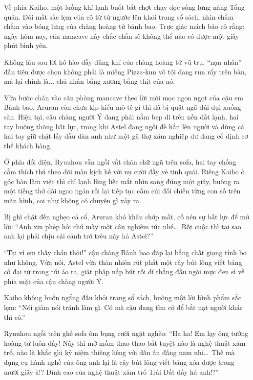 \documentclass[../main.tex]{subfiles}
\begin{document}
Về phía Kaiho, một luồng khí lạnh buốt bất chợt chạy dọc sống lưng nàng Tổng quản. Đôi mắt sắc lẹm của cô từ từ ngước lên khỏi trang sổ sách, nhìn chằm chằm vào bóng lưng của chàng hoàng tử bảnh bao. Trực giác mách bảo cô rằng: ngày hôm nay, căn mancave này chắc chắn sẽ không thể nào có được một giây phút bình yên.

\ct

Không lâu sau lời hô hào đầy dũng khí của chàng hoàng tử vũ trụ, ``nạn nhân'' đầu tiên được chọn không phải là miếng Pizza-kun vô tội đang run rẩy trên bàn, mà lại chính là... chủ nhân bằng xương bằng thịt của nó.

Vừa bước chân vào căn phòng mancave theo lời mời mọc ngon ngọt của cậu em Bảnh bao, Aruran còn chưa kịp hiểu mô tê gì thì đã bị quật ngã dúi dụi xuống sàn. Hiện tại, cậu chàng người Ý đang phải nằm bẹp dí trên nền đất lạnh, hai tay buông thõng bất lực, trong khi Astel đang ngồi đè hẳn lên người và dùng cả hai tay giữ chặt lấy đầu đàn anh như một gã thợ xăm nghiệp dư đang cố định cơ thể khách hàng.


Ở phía đối diện, Ryuuhou vẫn ngồi vắt chân chữ ngũ trên sofa, hai tay chống cằm thích thú theo dõi màn kịch hề với nụ cười đầy vẻ tinh quái. Riêng Kaiho ở góc bàn làm việc thì chỉ lạnh lùng liếc mắt nhìn sang đúng một giây, buông ra một tiếng thở dài ngao ngán rồi lại tiếp tục cắm cúi đối chiếu từng con số
trên màn hình, coi như không có chuyện gì xảy ra.

Bị ghì chặt đến nghẹo cả cổ, Aruran khó khăn chớp mắt, cố nén sự bất lực để mở lời: ``Anh xin phép hỏi chú mày một câu nghiêm túc nhé\dots\ Rốt cuộc thì tại sao anh lại phải chịu cái cảnh trớ trêu này hả Astel?''

``Tại vì em thấy chán thôi!'' cậu chàng Bảnh bao đáp lại bằng chất giọng tỉnh bơ như không. Vừa nói, Astel vừa thản nhiên rút phắt một cây bút lông viết bảng cỡ đại từ trong túi áo ra, giật phập nắp bút rồi dí thẳng đầu ngòi mực đen sì về phía mặt của cậu chàng người Ý.

Kaiho không buồn ngẩng đầu khỏi trang sổ sách, buông một lời bình phẩm sắc lẹm: ``Nói giảm nói tránh làm gì. Có mà cậu đang tìm cớ để bắt nạt người khác thì có.''

Ryuuhou ngồi trên ghế sofa ôm bụng cười ngặt nghẽo: ``Ha ha! Em lạy ông tướng hoàng tử luôn đấy! Nãy thì mở mồm thao thao bất tuyệt nào là nghệ thuật xăm trổ, nào là khắc ghi kỷ niệm thiêng liêng với dấu ấn đấng nam nhi\dots\ Thế mà dụng cụ hành nghề của ông anh lại là cây bút lông viết bảng xóa được trong mười giây à!? Đỉnh cao của nghệ thuật xăm trổ Trái Đất đấy hả anh!?''
\end{document}
